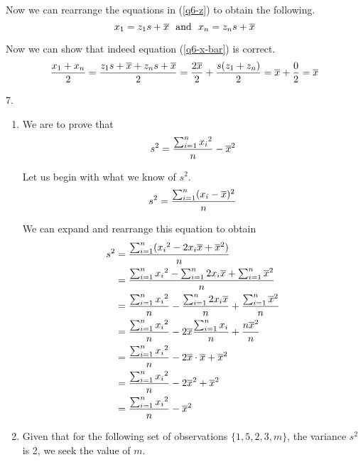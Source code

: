 \documentclass[fleqn]{article}
\begin{document}
\begin{answers}
	Now we can rearrange the equations in (\ref{q6-z}) to obtain the following.
	\begin{equation*}
		x_1 = z_1 s + \overline{x}
		\ \text{ and } \
		x_n = z_n s + \overline{x}
	\end{equation*}

	Now we can show that indeed equation (\ref{q6-x-bar}) is correct.
	\begin{equation*}
		\frac{x_1 + x_n}{2} = \frac{z_1 s + \overline{x} + z_n s + \overline{x}}{2} = \frac{2\overline{x}}{2} + \frac{s(z_1 + z_n)}{2} = \overline{x} + \frac{0}{2} = \overline{x}
	\end{equation*}

	\item[7.]
	\begin{enumerate}
		\item %
		We are to prove that
		\begin{equation*}
			s^2 = \frac{\sum_{i=1}^n {x_i}^2}{n} - \overline{x}^2
		\end{equation*}

		Let us begin with what we know of \(s^2\).
		\begin{equation*}
			s^2 = \frac{\sum_{i=1}^n (x_i - \overline{x})^2}{n}
		\end{equation*}

		We can expand and rearrange this equation to obtain
		\begin{align*}
			s^2 &= \frac{\sum_{i=1}^n ({x_i}^2 - 2 x_i \overline{x} + \overline{x}^2)}{n} \\
			&= \frac{\sum_{i=1}^n {x_i}^2 - \sum_{i=1}^n 2 x_i \overline{x} + \sum_{i=1}^n \overline{x}^2}{n} \\
			&= \frac{\sum_{i=1}^n {x_i}^2}{n} - \frac{\sum_{i=1}^n 2 x_i \overline{x}}{n} + \frac{\sum_{i=1}^n \overline{x}^2}{n} \\
			&= \frac{\sum_{i=1}^n {x_i}^2}{n} - 2 \overline{x} \frac{\sum_{i=1}^n x_i}{n} + \frac{n \overline{x}^2}{n} \\
			&= \frac{\sum_{i=1}^n {x_i}^2}{n} - 2 \overline{x} \cdot \overline{x} + \overline{x}^2 \\
			&= \frac{\sum_{i=1}^n {x_i}^2}{n} - 2 \overline{x}^2 + \overline{x}^2 \\
			&= \frac{\sum_{i=1}^n {x_i}^2}{n} - \overline{x}^2 \\
		\end{align*}

		\item %
		Given that for the following set of observations \(\{1, 5, 2, 3, m\}\), the variance \(s^2\) is 2, we seek the value of \(m\).


\end{enumerate}
\end{answers}
\end{document}
